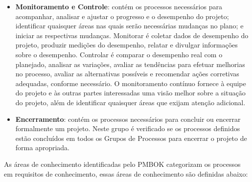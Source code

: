 \documentclass[
	12pt,
	openright,
	twoside,
	a4paper,
	english,
	brazil
	]{abntex2}
\begin{document}
\begin{itemize}
  \item \textbf{Monitoramento e Controle}: contém os processos necessários para acompanhar, analisar e ajustar o progresso e o desempenho do projeto; identificar quaisquer áreas nas quais serão necessárias mudanças no plano; e iniciar as respectivas mudanças. Monitorar é coletar dados de desempenho do projeto, produzir medições do desempenho, relatar e divulgar informações sobre o desempenho. Controlar é comparar o desempenho real com o planejado, analisar as variações, avaliar as tendências para efetuar melhorias no processo, avaliar as alternativas possíveis e recomendar ações corretivas adequadas, conforme necessário. O monitoramento contínuo fornece à equipe do projeto e às outras partes interessadas uma visão melhor sobre a situação do projeto, além de identificar quaisquer áreas que exijam atenção adicional.
  \item \textbf{Encerramento}: contém os processos necessários para concluir ou encerrar formalmente um projeto. Neste grupo é verificado se os processos definidos estão concluídos em todos os Grupos de Processos para encerrar o projeto de forma apropriada.
\end{itemize}

As áreas de conhecimento identificadas pelo PMBOK \cite{PMBOK} categorizam os processos em requisitos de conhecimento, essas áreas de conhecimento são definidas abaixo:
\end{document}
